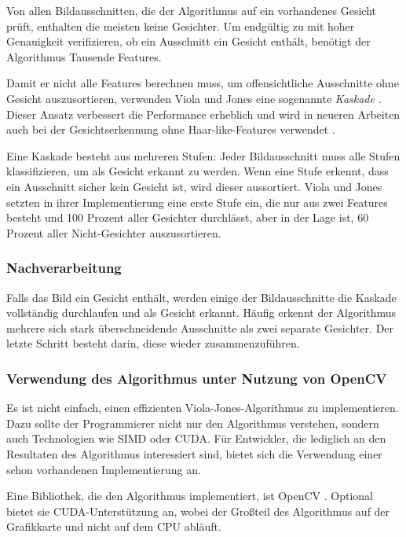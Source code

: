 \documentclass[doktyp=semarbeit, sprache=german]{TUBAFarbeiten}
\begin{document}
Von allen Bildausschnitten, die der Algorithmus auf ein vorhandenes Gesicht prüft, enthalten die meisten keine Gesichter. Um endgültig zu mit hoher Genauigkeit verifizieren, ob ein Ausschnitt ein Gesicht enthält, benötigt der Algorithmus Tausende Features.

Damit er nicht alle Features berechnen muss, um offensichtliche Ausschnitte ohne Gesicht auszusortieren, verwenden Viola und Jones eine sogenannte \textit{Kaskade} \cite{Viola01rapidobject}. Dieser Ansatz verbessert die Performance erheblich und wird in neueren Arbeiten auch bei der Gesichtserkennung ohne Haar-like-Features verwendet \cite{Li_2015_CVPR}.

Eine Kaskade besteht aus mehreren Stufen: Jeder Bildausschnitt muss alle Stufen klassifizieren, um als Gesicht erkannt zu werden. Wenn eine Stufe erkennt, dass ein Ausschnitt sicher kein Gesicht ist, wird dieser aussortiert. Viola und Jones setzten in ihrer Implementierung eine erste Stufe ein, die nur aus zwei Features besteht und 100 Prozent aller Gesichter durchlässt, aber in der Lage ist, 60 Prozent aller Nicht-Gesichter auszusortieren.

\subsubsection{Nachverarbeitung}

Falls das Bild ein Gesicht enthält, werden einige der Bildausschnitte die Kaskade vollständig durchlaufen und als Gesicht erkannt. Häufig erkennt der Algorithmus mehrere sich stark überschneidende Ausschnitte als zwei separate Gesichter. Der letzte Schritt besteht darin, diese wieder zusammenzuführen.

\subsubsection{Verwendung des Algorithmus unter Nutzung von OpenCV}
Es ist nicht einfach, einen effizienten Viola-Jones-Algorithmus zu implementieren. Dazu sollte der Programmierer nicht nur den Algorithmus verstehen, sondern auch Technologien wie SIMD oder CUDA. Für Entwickler, die lediglich an den Resultaten des Algorithmus interessiert sind, bietet sich die Verwendung einer schon vorhandenen Implementierung an.

Eine Bibliothek, die den Algorithmus implementiert, ist OpenCV \cite{opencv_library}. Optional bietet sie CUDA-Unterstützung an, wobei der Großteil des Algorithmus auf der Grafikkarte und nicht auf dem CPU abläuft.
\end{document}
